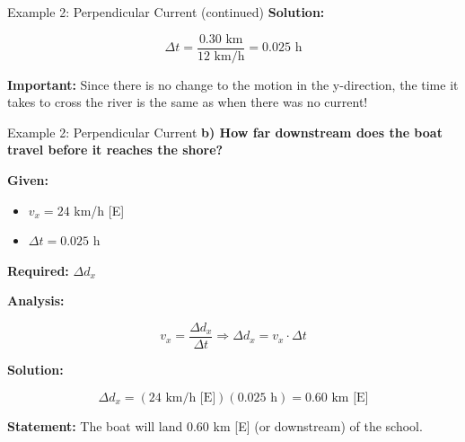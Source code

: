 \documentclass{beamer}
\begin{document}
\begin{frame}{Example 2: Perpendicular Current (continued)}
\textbf{Solution:}
 
\[\Delta t = \frac{0.30 \text{ km}}{12 \text{ km/h}} = 0.025 \text{ h}\]
 

\textbf{Important:} Since there is no change to the motion in the y-direction, the time it takes to cross the river is the same as when there was no current!
 
\vspace{0.3cm}

\begin{center}
\end{center}
\end{frame}

\begin{frame}{Example 2: Perpendicular Current}
\textbf{b) How far downstream does the boat travel before it reaches the shore?}
 
\vspace{0.3cm}

\textbf{Given:}
\begin{itemize}
\item \(v_x = 24\) km/h [E]
\item \(\Delta t = 0.025\) h
\end{itemize}
 

\textbf{Required:} \(\Delta d_x\)
 
\vspace{0.3cm}

\textbf{Analysis:} 
 
\[v_x = \frac{\Delta d_x}{\Delta t} \Rightarrow \Delta d_x = v_x \cdot \Delta t\]
 
\vspace{0.3cm}

\textbf{Solution:}
 
\[\Delta d_x = (24 \text{ km/h [E]})(0.025 \text{ h}) = 0.60 \text{ km [E]}\]
 
\textbf{Statement:} The boat will land 0.60 km [E] (or downstream) of the school.
\end{frame}
\end{document}
